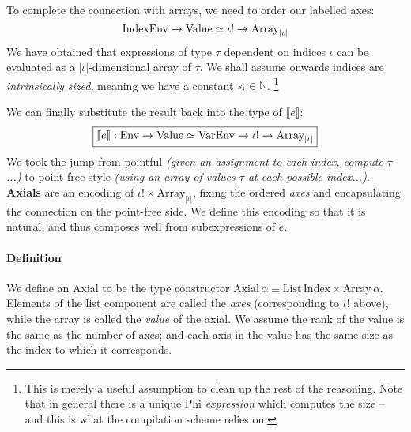 To complete the connection with arrays, we need to order our labelled axes:
$$ \mathrm{IndexEnv} \to \mathrm{Value} \simeq \iota! \to \mathrm{Array}_{|\iota|} $$
We have obtained that expressions of type $\tau$ dependent on indices $\iota$ can be evaluated as a $|\iota|$-dimensional array of $\tau$. We shall assume onwards indices are \textit{intrinsically sized}, meaning we have a constant $s_i \in \mathbb N$.%
\footnote{This is merely a useful assumption to clean up the rest of the reasoning. Note that in general there is a unique Phi \textit{expression} which computes the size -- and this is what the compilation scheme relies on.}

We can finally substitute the result back into the type of $\llbracket e \rrbracket$:
$$ \boxed{ \llbracket e \rrbracket : \mathrm{Env} \to \mathrm{Value} \simeq \mathrm{VarEnv} \to \iota! \to \mathrm{Array}_{|\iota|} } $$
We took the jump from pointful \textit{(given an assignment to each index, compute $\tau$...)} to point-free style \textit{(using an array of values $\tau$ at each possible index...)}. \textbf{Axials} are an encoding of $\iota! \times \mathrm{Array}_{|\iota|}$, fixing the ordered \textit{axes} and encapsulating the connection on the point-free side. We define this encoding so that it is natural, and thus composes well from subexpressions of $e$.

\paragraph{Definition} 
We define an Axial to be the type constructor $\mathrm{Axial}\,\alpha \equiv \mathrm{List}\,\mathrm{Index} \times \mathrm{Array}\,\alpha$. Elements of the list component are called the \textit{axes} (corresponding to $\iota!$ above), while the array is called the \textit{value} of the axial. We assume the rank of the value is the same as the number of axes; and each axis in the value has the same size as the index to which it corresponds.

